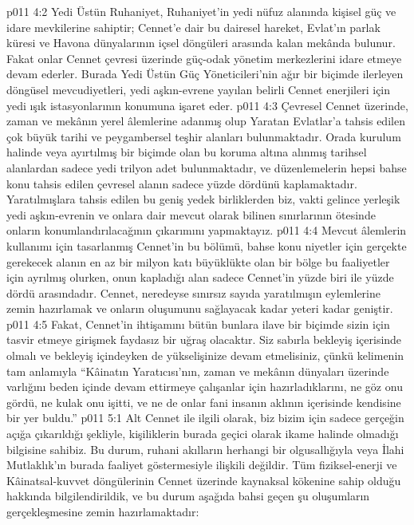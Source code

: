 \vs p011 4:2 Yedi Üstün Ruhaniyet, Ruhaniyet’in yedi nüfuz alanında kişisel güç ve idare mevkilerine sahiptir; Cennet’e dair bu dairesel hareket, Evlat’ın parlak küresi ve Havona dünyalarının içsel döngüleri arasında kalan mekânda bulunur. Fakat onlar Cennet çevresi üzerinde güç\hyp{}odak yönetim merkezlerini idare etmeye devam ederler. Burada Yedi Üstün Güç Yöneticileri’nin ağır bir biçimde ilerleyen döngüsel mevcudiyetleri, yedi aşkın\hyp{}evrene yayılan belirli Cennet enerjileri için yedi ışık istasyonlarının konumuna işaret eder.
\vs p011 4:3 Çevresel Cennet üzerinde, zaman ve mekânın yerel âlemlerine adanmış olup Yaratan Evlatlar’a tahsis edilen çok büyük tarihi ve peygambersel teşhir alanları bulunmaktadır. Orada kurulum halinde veya ayırtılmış bir biçimde olan bu koruma altına alınmış tarihsel alanlardan sadece yedi trilyon adet bulunmaktadır, ve düzenlemelerin hepsi bahse konu tahsis edilen çevresel alanın sadece yüzde dördünü kaplamaktadır. Yaratılmışlara tahsis edilen bu geniş yedek birliklerden biz, vakti gelince yerleşik yedi aşkın\hyp{}evrenin ve onlara dair mevcut olarak bilinen sınırlarının ötesinde onların konumlandırılacağının çıkarımını yapmaktayız.
\vs p011 4:4 Mevcut âlemlerin kullanımı için tasarlanmış Cennet’in bu bölümü, bahse konu niyetler için gerçekte gerekecek alanın en az bir milyon katı büyüklükte olan bir bölge bu faaliyetler için ayrılmış olurken, onun kapladığı alan sadece Cennet’in yüzde biri ile yüzde dördü arasındadır. Cennet, neredeyse sınırsız sayıda yaratılmışın eylemlerine zemin hazırlamak ve onların oluşumunu sağlayacak kadar yeteri kadar geniştir.
\vs p011 4:5 Fakat, Cennet’in ihtişamını bütün bunlara ilave bir biçimde sizin için tasvir etmeye girişmek faydasız bir uğraş olacaktır. Siz sabırla bekleyiş içerisinde olmalı ve bekleyiş içindeyken de yükselişinize devam etmelisiniz, çünkü kelimenin tam anlamıyla “Kâinatın Yaratıcısı’nın, zaman ve mekânın dünyaları üzerinde varlığını beden içinde devam ettirmeye çalışanlar için hazırladıklarını, ne göz onu gördü, ne kulak onu işitti, ve ne de onlar fani insanın aklının içerisinde kendisine bir yer buldu.”
\vs p011 5:1 Alt Cennet ile ilgili olarak, biz bizim için sadece gerçeğin açığa çıkarıldığı şekliyle, kişiliklerin burada geçici olarak ikame halinde olmadığı bilgisine sahibiz. Bu durum, ruhani akılların herhangi bir olgusallığıyla veya İlahi Mutlaklık’ın burada faaliyet göstermesiyle ilişkili değildir. Tüm fiziksel\hyp{}enerji ve Kâinatsal\hyp{}kuvvet döngülerinin Cennet üzerinde kaynaksal kökenine sahip olduğu hakkında bilgilendirildik, ve bu durum aşağıda bahsi geçen şu oluşumların gerçekleşmesine zemin hazırlamaktadır:

